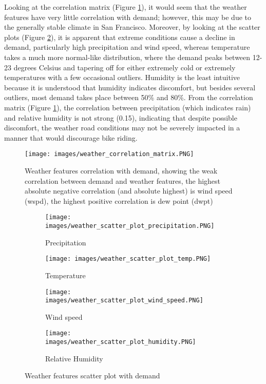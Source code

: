 \documentclass{article}
\begin{document}
Looking at the correlation matrix (Figure \ref{fig:weather_correlation}), it would seem that the weather features have very little correlation with demand; however, this may be due to the generally stable climate in San Francisco. Moreover, by looking at the scatter plots (Figure \ref{fig:weather_demand_scatter}), it is apparent that extreme conditions cause a decline in demand, particularly high precipitation and wind speed, whereas temperature takes a much more normal-like distribution, where the demand peaks between 12-23 degrees Celsius and tapering off for either extremely cold or extremely temperatures with a few occasional outliers. Humidity is the least intuitive because it is understood that humidity indicates discomfort, but besides several outliers, most demand takes place between 50\% and 80\%. From the correlation matrix (Figure \ref{fig:weather_correlation}), the correlation between precipitation (which indicates rain) and relative humidity is not strong (0.15), indicating that despite possible discomfort, the weather road conditions may not be severely impacted in a manner that would discourage bike riding.

\begin{figure}
\texttt{[image: images/weather\_correlation\_matrix.PNG]}
\caption{Weather features correlation with demand, showing the weak correlation between demand and weather features, the highest absolute negative correlation (and absolute highest) is wind speed (wspd), the highest positive correlation is dew point (dwpt)}
\label{fig:weather_correlation}
\end{figure}

\begin{figure}[H]
    \begin{subfigure}[b]{0.45\textwidth}
        \texttt{[image: images/weather\_scatter\_plot\_precipitation.PNG]}
        \caption{Precipitation}
    \end{subfigure}
    \hfill
    \begin{subfigure}[b]{0.45\textwidth}
        \texttt{[image: images/weather\_scatter\_plot\_temp.PNG]}
        \caption{Temperature}
    \end{subfigure}

    \vspace{0.5cm}
    \begin{subfigure}[b]{0.45\textwidth}
        \texttt{[image: images/weather\_scatter\_plot\_wind\_speed.PNG]}
        \caption{Wind speed}
    \end{subfigure}
    \hfill
    \begin{subfigure}[b]{0.45\textwidth}
        \texttt{[image: images/weather\_scatter\_plot\_humidity.PNG]}
        \caption{Relative Humidity}
    \end{subfigure}
\caption{Weather features scatter plot with demand}
\label{fig:weather_demand_scatter}
\end{figure}
\end{document}
